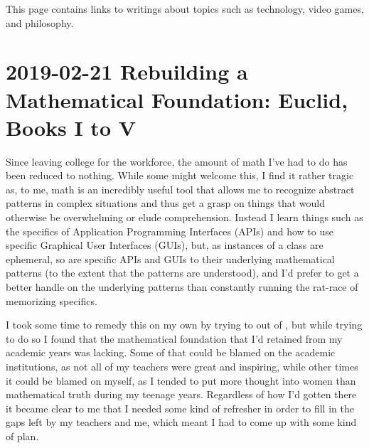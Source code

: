 \documentclass{article}
\begin{document}
This page contains links to writings about topics such as technology, video games, and philosophy.

\tableofchildlinks*

\section{2019-02-21 Rebuilding a Mathematical Foundation: Euclid, Books I to V}
Since leaving college for the workforce, the amount of math I've had to do has been reduced to nothing.  While some might welcome this, I find it rather tragic as, to me, math is an incredibly useful tool that allows me to recognize abstract patterns in complex situations and thus get a grasp on things that would otherwise be overwhelming or elude comprehension.  Instead I learn things such as the specifics of Application Programming Interfaces (APIs) and how to use specific Graphical User Interfaces (GUIs), but, as instances of a class are ephemeral, so are specific APIs and GUIs to their underlying mathematical patterns (to the extent that the patterns are understood), and I'd prefer to get a better handle on the underlying patterns than constantly running the rat-race of memorizing specifics.

I took some time to remedy this on my own by trying to  out of , but while trying to do so I found that the mathematical foundation that I'd retained from my academic years was lacking.  Some of that could be blamed on the academic institutions, as not all of my teachers were great and inspiring, while other times it could be blamed on myself, as I tended to put more thought into women than mathematical truth during my teenage years.  Regardless of how I'd gotten there it became clear to me that I needed some kind of refresher in order to fill in the gaps left by my teachers and me, which meant I had to come up with some kind of plan.
\end{document}
